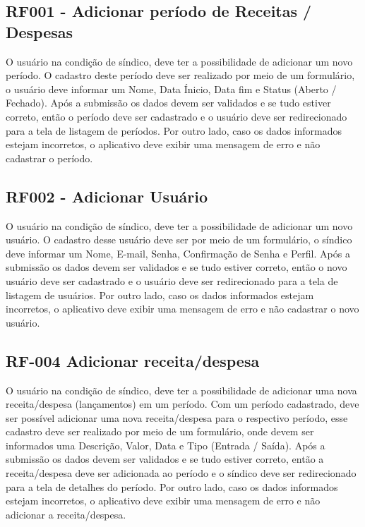 \documentclass[12pt]{article}
\begin{document}
\subsection{RF001 - Adicionar período de Receitas / Despesas}
\label{sec:rf001}
O usuário na condição de síndico, deve ter a possibilidade de adicionar um novo período. O cadastro deste período deve ser realizado por meio de um formulário, o usuário deve informar um Nome, Data Ínicio, Data fim e Status (Aberto / Fechado). Após a submissão os dados devem ser validados e se tudo estiver correto, então o período deve ser cadastrado e o usuário deve ser redirecionado para a tela de listagem de períodos. Por outro lado, caso os dados informados estejam incorretos, o aplicativo deve exibir uma mensagem de erro e não cadastrar o período.

\subsection{RF002 - Adicionar Usuário}
O usuário na condição de síndico, deve ter a possibilidade de adicionar um novo usuário. O cadastro desse usuário deve ser por meio de um formulário, o síndico deve informar um Nome, E-mail, Senha, Confirmação de Senha e Perfil. Após a submissão os dados devem ser validados e se tudo estiver correto, então o novo usuário deve ser cadastrado e o usuário deve ser redirecionado para a tela de listagem de usuários. Por outro lado, caso os dados informados estejam incorretos, o aplicativo deve exibir uma mensagem de erro e não cadastrar o novo usuário.

\subsection{RF-004 Adicionar receita/despesa}
\label{sec:add_rec_desp}
O usuário na condição de síndico, deve ter a possibilidade de adicionar uma nova receita/despesa (lançamentos) em um período.
Com um período cadastrado, deve ser possível adicionar uma nova receita/despesa para o respectivo período, esse cadastro deve ser realizado por meio de um formulário, onde devem ser informados uma Descrição, Valor, Data e Tipo (Entrada / Saída). Após a submissão os dados devem ser validados e se tudo estiver correto, então a receita/despesa deve ser adicionada ao período e o síndico deve ser redirecionado para a tela de detalhes do período.
Por outro lado, caso os dados informados estejam incorretos, o aplicativo deve exibir uma mensagem de erro e não adicionar a receita/despesa.
\end{document}
